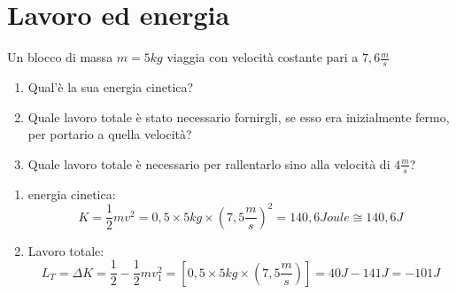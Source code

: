 \section{Lavoro ed energia}
\begin{esempio}
  Un blocco di massa $m=5kg$ viaggia con velocità costante pari a $7,6\frac{m}{s}$
  \begin{enumerate}
  \item Qual'è la sua energia cinetica?
  \item Quale lavoro totale è stato necessario fornirgli, se esso era inizialmente
    fermo, per portario a quella velocità?
  \item Quale lavoro totale è necessario per rallentarlo sino alla velocità di
    $4\frac{m}{s}$?
  \end{enumerate}
  \begin{enumerate}
  \item energia cinetica:
    \begin{equation*}
      K=\frac{1}{2}mv^2=0,5\times 5kg \times \left(7,5\frac{m}{s}\right)^2=140,6 Joule
      \cong 140,6J
    \end{equation*}
  \item Lavoro totale:
    \begin{equation*}
      L_T=\Delta K=\frac{1}{2}-\frac{1}{2}mv_1^2=[0,5\times 5kg\times (7,5\frac{m}{s})]=
      40J-141J=-101J
    \end{equation*}
  \end{enumerate}
\end{esempio}
